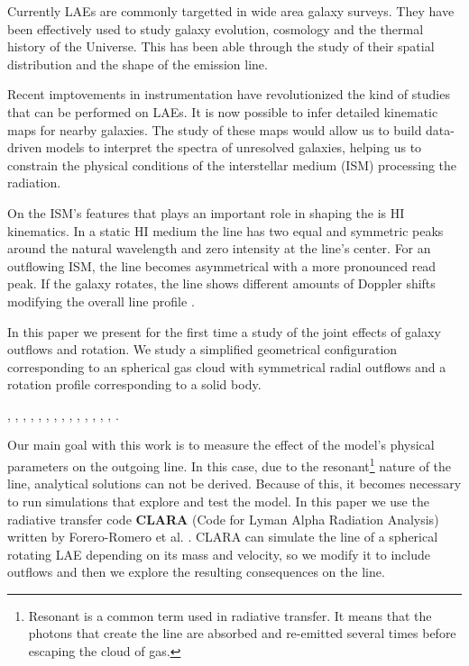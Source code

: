 \documentclass[twocolappendix]{latex/emulateapj}
\begin{document}
Currently LAEs are commonly targetted in wide area galaxy surveys.
They have been effectively used to study galaxy evolution,
cosmology and the thermal history of the Universe.
This has been able through the study of their spatial distribution and
the shape of the \lya emission line.

Recent imptovements in instrumentation have revolutionized the kind of
studies that can be performed on LAEs.  
It is now possible to infer detailed kinematic maps for nearby galaxies.
The study of these maps would allow us to build data-driven models to
interpret the \lya spectra of unresolved galaxies, helping us to
constrain the physical conditions of the interstellar medium (ISM)
processing the \lya radiation.

On the ISM's features that plays an important role in shaping the \lya
is HI kinematics. 
In a static HI medium the \lya line has  two equal and symmetric peaks
around the natural \lya wavelength and zero intensity at the line's
center.
For an outflowing ISM, the line becomes
asymmetrical with a more pronounced read peak.
If the galaxy rotates, the line shows different amounts of Doppler
shifts modifying the overall line profile \cite{Garavito14}.

In this paper we present for the first time a study of the joint
effects of galaxy outflows and rotation.
We study a simplified geometrical configuration corresponding to an
spherical gas cloud with symmetrical radial outflows and a rotation
profile corresponding to a solid body.

\cite{DjorgovskiThompson}, \cite{Rhoads00},
\cite{Gawiser2007}, \cite{Koehler2007}, \cite{Ouchi08},
\cite{Yamada2012}, \cite{Schenker2012}, \cite{Kulas12},
\cite{Yamada2012}, \cite{Chonis2013}, \cite{Finkelstein2013},
\cite{Ostlin14}, \cite{Hayes2014}, \cite{Faisst2014},
\cite{Fumagalli2015}.


Our main goal with this work is to measure the effect of the model's
physical parameters on the outgoing \lya line.
In this case, due to
the resonant\footnote{Resonant is a common term used in radiative
  transfer. It means that the photons that create the line are
  absorbed and re-emitted several times before escaping the cloud of
  gas.} nature of the \lya line, analytical solutions can not be
derived. Because of this, it becomes necessary to run simulations that
explore and test the model. In this paper we use the radiative
transfer code \textbf{CLARA} (Code for Lyman Alpha Radiation Analysis)
written by Forero-Romero et al. \cite{CLARA}. CLARA can simulate the
\lya line of a spherical rotating LAE depending on its mass and
velocity, so we modify it to include outflows and then we explore the
resulting consequences on the \lya line. \\
\end{document}
